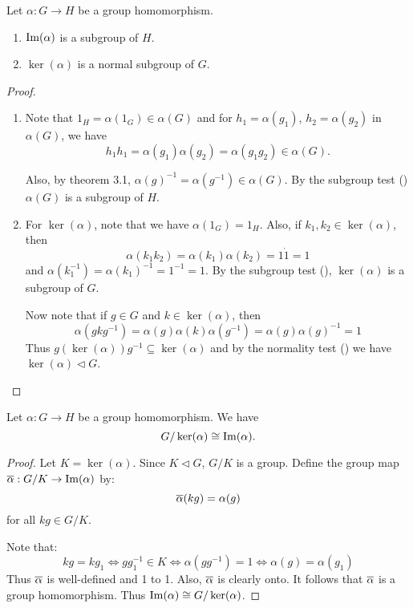 \documentclass[11pt]{article}
\begin{document}
\begin{proposition}
    Let $\alpha:G\to H$ be a group homomorphism.
    \begin{enumerate}
        \item $\operatorname{Im}(\alpha)$ is a subgroup of $H$.
        \item $\ker(\alpha)$ is a normal subgroup of $G$.
    \end{enumerate}
\end{proposition}

\begin{proof}\,
\begin{enumerate}
    \item Note that $1_H=\alpha(1_G)\in\alpha(G)$ and for $h_1=\alpha(g_1)$, $h_2=\alpha(g_2)$ in $\alpha(G)$, we have
    \[h_1h_1=\alpha(g_1)\alpha(g_2)=\alpha(g_1g_2)\in\alpha(G).\]
    
    Also, by theorem 3.1, $\alpha(g)^{-1}=\alpha(g^{-1})\in\alpha(G)$. By the subgroup test () $\alpha(G)$ is a subgroup of $H$.

    \item For $\ker(\alpha)$, note that we have $\alpha(1_G)=1_H$. Also, if $k_1,k_2\in\ker(\alpha)$, then
    \[\alpha(k_1k_2)=\alpha(k_1)\alpha(k_2)=1\dot1=1\]
    and $\alpha(k_1^{-1})=\alpha(k_1)^{-1}=1^{-1}=1$. By the subgroup test (), $\ker(\alpha)$ is a subgroup of $G$.

    Now note that if $g\in G$ and $k\in\ker(\alpha)$, then
    \[\alpha(gkg^{-1})=\alpha(g)\alpha(k)\alpha(g^{-1})=\alpha(g)\alpha(g)^{-1}=1\]
    Thus $g(\ker(\alpha))g^{-1}\subseteq\ker(\alpha)$ and by the normality test () we have $\ker(\alpha)\lhd G$.
\end{enumerate}
\end{proof}

\begin{theorem}
    Let $\alpha:G\to H$ be a group homomorphism. We have
    \[G/\ker(\alpha)\cong\operatorname{Im}(\alpha).\]
\end{theorem}

\begin{proof}
    Let $K=\ker(\alpha)$. Since $K\lhd G$, $G/K$ is a group. Define the group map $\overline{\alpha}:G/K\to\operatorname{Im}(\alpha)$ by:
    \[\overline{\alpha}(kg)=\alpha(g)\]
    for all $kg\in G/K$.
    
    Note that:
    \[kg=kg_1\iff gg_1^{-1}\in K\iff\alpha(gg^{-1})=1\iff\alpha(g)=\alpha(g_1)\]
    Thus $\overline{\alpha}$ is well-defined and 1 to 1. Also, $\overline{\alpha}$ is clearly onto. It follows that $\overline{\alpha}$ is a group homomorphism. Thus $\operatorname{Im}(\alpha)\cong G/\ker(\alpha)$.
\end{proof}
\end{document}
